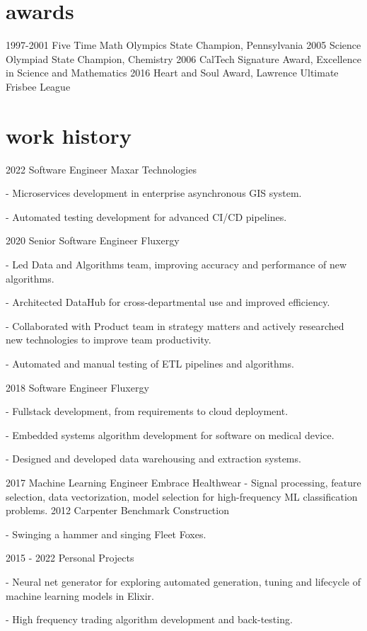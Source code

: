 \documentclass[]{twentysecondcv}
\begin{document}

\section{awards}

\begin{twentyshort}
  \twentyitemshort
    {1997-2001}
	{Five Time Math Olympics State Champion, Pennsylvania}
  \twentyitemshort
    {2005}
    {Science Olympiad State Champion, Chemistry}
  \twentyitemshort
    {2006}
    {CalTech Signature Award, Excellence in Science and Mathematics}
  \twentyitemshort
    {2016}
    {Heart and Soul Award, Lawrence Ultimate Frisbee League}
\end{twentyshort}


\section{work history}

\begin{twenty}
  \twentyitem
    {2022}
    {Software Engineer}
    {Maxar Technologies}
    {- Microservices development in enterprise asynchronous GIS system. 

	- Automated testing development for advanced CI/CD pipelines.

}

  \twentyitem
    {2020}
    {Senior Software Engineer}
    {Fluxergy}
    {- Led Data and Algorithms team, improving accuracy and performance of new algorithms.

	- Architected DataHub for cross-departmental use and improved efficiency.

	- Collaborated with Product team in strategy matters and actively researched new technologies to improve team productivity.
	
	- Automated and manual testing of ETL pipelines and algorithms.

	} 
  \twentyitem
    {2018}
    {Software Engineer}
    {Fluxergy}
    {- Fullstack development, from requirements to cloud deployment.

	- Embedded systems algorithm development for software on medical device.

	- Designed and developed data warehousing and extraction systems.

	} 
  \twentyitem
    {2017}
    {Machine Learning Engineer}
    {Embrace Healthwear}
    {- Signal processing, feature selection, data vectorization, model selection for high-frequency ML classification problems.
	} 
  \twentyitem
    {2012}
    {Carpenter}
    {Benchmark Construction}
    {- Swinging a hammer and singing Fleet Foxes.

	} 
  \twentyitem
    {2015 - 2022}
    {Personal Projects}
    {}
    {- Neural net generator for exploring automated generation, tuning and lifecycle of machine learning models in Elixir.

	- High frequency trading algorithm development and back-testing.} 
\end{twenty}
\end{document}
